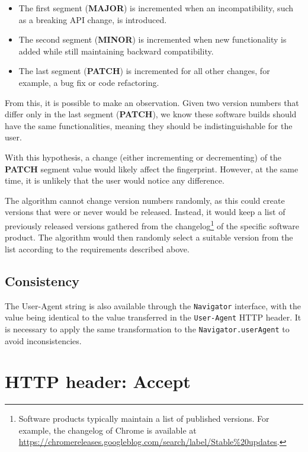 \begin{itemize}
	\item The first segment (\textbf{MAJOR}) is incremented when an incompatibility, such as a breaking API change, is introduced.
	\item The second segment (\textbf{MINOR}) is incremented when new functionality is added while still maintaining backward compatibility.
	\item The last segment (\textbf{PATCH}) is incremented for all other changes, for example, a bug fix or code refactoring.
\end{itemize}

From this, it is possible to make an observation. Given two version numbers that differ only in the last segment (\textbf{PATCH}), we know these software builds should have the same functionalities, meaning they should be indistinguishable for the user.

With this hypothesis, a change (either incrementing or decrementing) of the \textbf{PATCH} segment value would likely affect the fingerprint. However, at the same time, it is unlikely that the user would notice any difference.

The algorithm cannot change version numbers randomly, as this could create versions that were or never would be released. Instead, it would keep a list of previously released versions gathered from the changelog\footnote{Software products typically maintain a list of published versions. For example, the changelog of Chrome is available at \url{https://chromereleases.googleblog.com/search/label/Stable\%20updates}.} of the specific software product. The algorithm would then randomly select a suitable version from the list according to the requirements described above.

\subsection{Consistency}

The User-Agent string is also available through the \texttt{Navigator} interface, with the value being identical to the value transferred in the \texttt{User-Agent} HTTP header. It is necessary to apply the same transformation to the \texttt{Navigator.userAgent} to avoid inconsistencies.

\section{HTTP header: Accept}
\label{SectionHTTPHeaderAccept}

